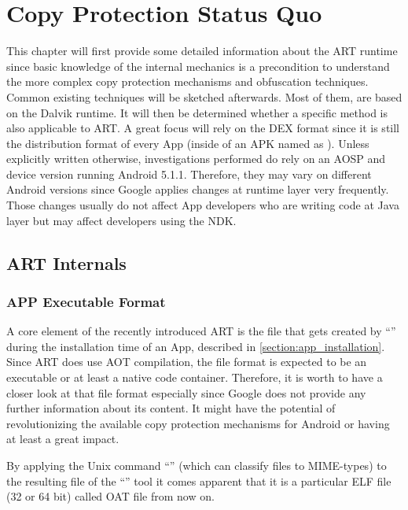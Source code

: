 \chapter{Copy Protection Status Quo}
\label{chapter:copy_protection_status_quo}

This chapter will first provide some detailed information about the ART runtime since basic knowledge of the internal mechanics is a precondition to understand the more complex copy protection mechanisms and obfuscation techniques. Common existing techniques will be sketched afterwards. Most of them, are based on the Dalvik runtime. It will then be determined whether a specific method is also
applicable to ART. A great focus will rely on the DEX format since
it is still the distribution format of every App (inside of an APK named as
). Unless explicitly written otherwise, investigations performed do rely on an AOSP and device version running Android 5.1.1.
Therefore, they may vary on different Android versions since Google applies changes at runtime layer very frequently. Those changes usually do not affect App developers who are writing code at Java layer but may affect developers
using the NDK.

\section{ART Internals}
\label{section:art_internals}

\subsection{APP Executable Format}\label{section:app_executable_format}

A core element of the recently introduced ART is the file that
gets created by ``'' during the installation time of an App,
described in \autoref{section:app_installation}.
Since ART does use AOT compilation, the file format is expected
to be an executable or at least a native code container.
Therefore, it is worth to have a closer look at that file format
especially since Google does not provide any further information
about its content. It might have the potential of
revolutionizing the available copy protection mechanisms for
Android or having at least a great impact.

By applying the Unix command ``'' (which can classify
files to MIME-types) to the resulting file of the ``''
tool it comes apparent that it is a particular ELF file (32 or 64 bit)
called OAT file from now on.

